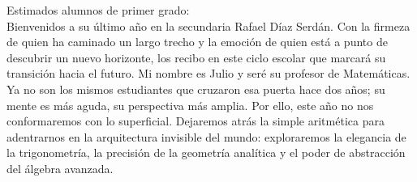 \documentclass[11pt]{report}
\begin{document}
\begin{titlepage}




\vspace{0.7em}

\raggedright Estimados alumnos de primer grado:\\

Bienvenidos a su último año en la secundaria Rafael Díaz Serdán. Con la firmeza de quien ha caminado un largo trecho y la emoción de quien está a punto de descubrir un nuevo horizonte, los recibo en este ciclo escolar que marcará su transición hacia el futuro. Mi nombre es Julio y seré su profesor de Matemáticas. Ya no son los mismos estudiantes que cruzaron esa puerta hace dos años; su mente es más aguda, su perspectiva más amplia. Por ello, este año no nos conformaremos con lo superficial. Dejaremos atrás la simple aritmética para adentrarnos en la arquitectura invisible del mundo: exploraremos la elegancia de la trigonometría, la precisión de la geometría analítica y el poder de abstracción del álgebra avanzada.


\end{titlepage}
\end{document}
